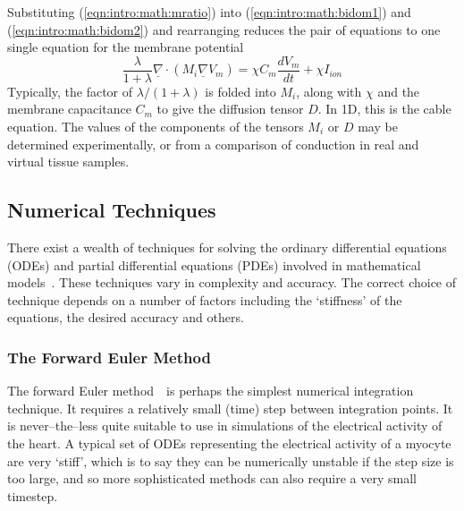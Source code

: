 Substituting (\ref{eqn:intro:math:mratio}) into (\ref{eqn:intro:math:bidom1})
and (\ref{eqn:intro:math:bidom2}) and rearranging reduces the pair of equations
to one single equation for the membrane potential
\begin{equation}
\frac{\lambda}{1+\lambda}\underline{\nabla}\cdot\left(M_{i}\underline{\nabla}V_{m}\right) = \chi C_{m}\frac{dV_{m}}{dt} + \chi{I_{ion}}
\label{eqn:intro:math:mono}
\end{equation}
Typically, the factor of ${\lambda}/\left({1+\lambda}\right)$ is folded into
$M_{i}$, along with $\chi$ and the membrane capacitance $C_m$ to give the diffusion tensor $D$.
In 1D, this is the cable equation.
The values of the components of the tensors $M_{i}$ or $D$ may be determined experimentally, or from a comparison of conduction in real and virtual tissue samples.

\subsection{Numerical Techniques}

There exist a wealth of techniques for solving the ordinary differential
equations (ODEs) and partial differential equations (PDEs) involved in
mathematical models~\cite{Sundnes2006}.
These techniques vary in complexity and accuracy.
The correct choice of technique depends on a number of factors including the
`stiffness' of the equations, the desired accuracy and others.

\subsubsection{The Forward Euler Method}

The forward Euler method~\cite{Birkhoff1989}\ is perhaps the simplest numerical
integration technique.
It requires a relatively small (time) step between integration points.
It is never--the--less quite suitable to use in simulations of the electrical
activity of the heart.
A typical set of ODEs representing the electrical activity of a myocyte are very
`stiff', which is to say they can be numerically unstable if the step size is
too large, and so more sophisticated methods can also require a very small
timestep.

